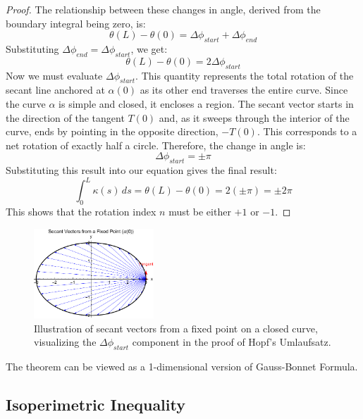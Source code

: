 \documentclass{article}
\begin{document}
\begin{proof}
The relationship between these changes in angle, derived from the boundary integral being zero, is:
\[ \theta(L) - \theta(0) = \Delta\phi_{start} + \Delta\phi_{end} \]
Substituting $\Delta\phi_{end} = \Delta\phi_{start}$, we get:
\[ \theta(L) - \theta(0) = 2 \Delta\phi_{start} \]
Now we must evaluate $\Delta\phi_{start}$. This quantity represents the total rotation of the secant line anchored at $\alpha(0)$ as its other end traverses the entire curve. Since the curve $\alpha$ is simple and closed, it encloses a region. The secant vector starts in the direction of the tangent $T(0)$ and, as it sweeps through the interior of the curve, ends by pointing in the opposite direction, $-T(0)$. This corresponds to a net rotation of exactly half a circle. Therefore, the change in angle is:
\[ \Delta\phi_{start} = \pm\pi \]
Substituting this result into our equation gives the final result:
\[ \int_0^L \kappa(s) \, ds = \theta(L) - \theta(0) = 2(\pm \pi) = \pm 2\pi \]
This shows that the rotation index $n$ must be either $+1$ or $-1$.
\end{proof}

\begin{figure}[h!] %
    \centering %
    \includegraphics[width=0.4\textwidth,height=0.3\textwidth]{hopf_secants.pdf} %
    \caption{Illustration of secant vectors from a fixed point on a closed curve,
             visualizing the $\Delta\phi_{start}$ component in the proof of Hopf's Umlaufsatz.}
    \label{fig:hopf_secants} %
\end{figure}

\begin{remark}
    The theorem can be viewed as a 1-dimensional version of Gauss-Bonnet Formula.
\end{remark}

\subsection{Isoperimetric Inequality}
\end{document}
